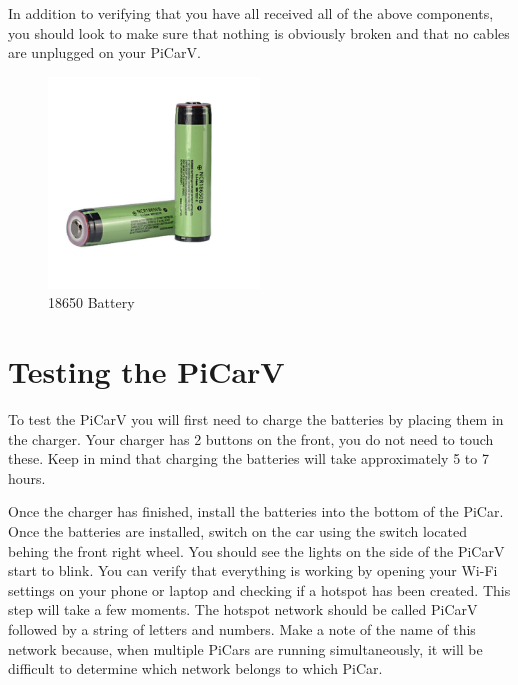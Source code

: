 \documentclass[11pt]{report}
\begin{document}
    In addition to verifying that you have all received all of the above components, you should look to make sure that nothing is obviously broken and that no cables are unplugged on your PiCarV.

\begin {figure}[h]
    \centering
    \includegraphics[width=0.5\textwidth]{battery.jpg}
    \caption{18650 Battery}
    \label{fig: 18650 Battery}
\end{figure}
    

\section{Testing the PiCarV}
To test the PiCarV you will first need to charge the batteries by placing them in the charger. Your charger has 2 buttons on the front, you do not need to touch these. Keep in mind that charging the batteries will take approximately 5 to 7 hours.


Once the charger has finished, install the batteries into the bottom of the PiCar. Once the batteries are installed, switch on the car using the switch located behing the front right wheel. You should see the lights on the side of the PiCarV start to blink. You can verify that everything is working by opening your Wi-Fi settings on your phone or laptop and checking if a hotspot has been created. This step will take a few moments. The hotspot network should be called PiCarV followed by a string of letters and numbers. Make a note of the name of this network because, when multiple PiCars are running simultaneously, it will be difficult to determine which network belongs to which PiCar.
\end{document}
